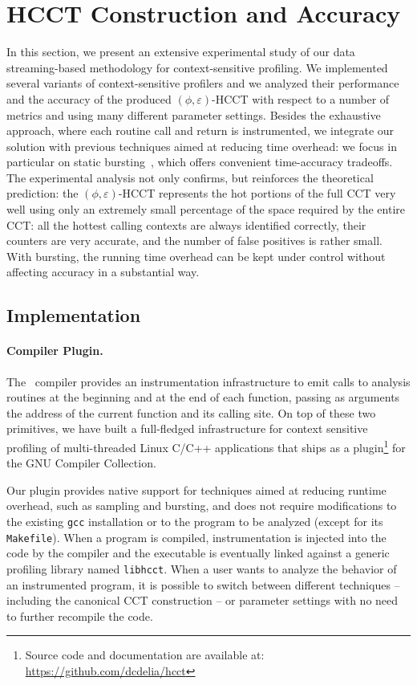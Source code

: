 \section{HCCT Construction and Accuracy}

In this section, we present an extensive experimental study of our data streaming-based methodology for context-sensitive profiling. We implemented several variants of context-sensitive profilers and we analyzed their performance and the accuracy of the produced $(\phi,\varepsilon)$-HCCT with respect to a number of metrics and using many different parameter settings. Besides the exhaustive approach, where each routine call and return is instrumented, we integrate our solution with previous techniques aimed at reducing time overhead: we focus in particular on static bursting~\cite{Zhuang06}, which offers convenient time-accuracy tradeoffs. The experimental analysis not only confirms, but reinforces the theoretical prediction: the $(\phi,\varepsilon)$-HCCT represents the hot portions of the full CCT very well using only an extremely small percentage of the space required by the entire CCT: all the hottest calling contexts are always identified correctly, their counters are very accurate, and the number of false positives is rather small. With bursting, the running time overhead can be kept under control without affecting accuracy in a substantial way.

\subsection{Implementation}

\paragraph*{Compiler Plugin.} The \gcc\ compiler provides an instrumentation infrastructure to emit calls to analysis routines at the beginning and at the end of each function, passing as arguments the address of the current function and its calling site. On top of these two primitives, we have built a full-fledged infrastructure for context sensitive profiling of multi-threaded Linux C/C++ applications that ships as a plugin\footnote{Source code and documentation are available at: \url{https://github.com/dcdelia/hcct}} for the GNU Compiler Collection.

Our plugin provides native support for techniques aimed at reducing runtime overhead, such as sampling and bursting, and does not require modifications to the existing {\tt gcc} installation or to the program to be analyzed (except for its {\tt Makefile}). When a program is compiled, instrumentation is injected into the code by the compiler and the executable is eventually linked against a generic profiling library named {\tt libhcct}. When a user wants to analyze the behavior of an instrumented program, it is possible to switch between different techniques -- including the canonical CCT construction -- or parameter settings with no need to further recompile the code.

